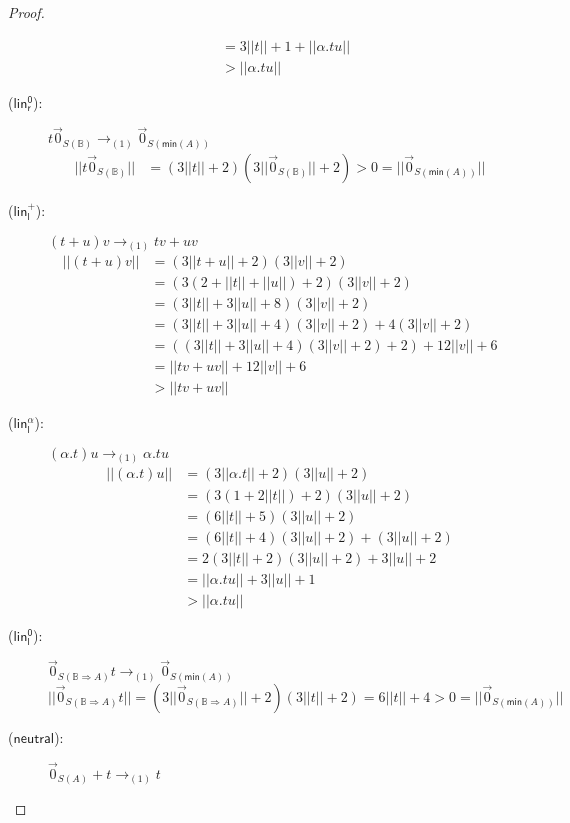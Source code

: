 \documentclass[preprint]{elsarticle}
\newcommand\size[1]{||#1||}
\newcommand\lra[1][1]{\longrightarrow_{\left(#1\right)}}
\newcommand\B{\ensuremath{\mathbb B}}
\newcommand\s[1]{\ensuremath{\mathsf{#1}}}
\newcommand\z[1][A]{\vec 0_{S(#1)}}
\newcommand\nullvec[1]{\z[#1]}
\newcommand\rlinzr{(\s{lin^0_r})}
\newcommand\rlinl{(\s{lin^+_l})}
\newcommand\rlinscall{(\s{lin^\alpha_l})}
\newcommand\rlinzl{(\s{lin^0_l})}
\newcommand\rneut{(\s{neutral})}
\begin{document}
\begin{proof}
\begin{description}
\begin{align*}
     & = 3 \size{t} + 1 + \size{\alpha . {t}{u}} \\
     & > \size{\alpha . {t}{u}}
   \end{align*}
 \item[\rlinzr:] \( {t}{\nullvec{\B}} \lra \nullvec{\mathsf{min}(A)} \)
   \begin{align*}
     \size{{t}{\nullvec{\B}}} & = (3 \size{t} + 2) (3 \size{\nullvec{\B}} +
                                2) > 0 = \size{\nullvec{\mathsf{min}(A)}}
   \end{align*}
 \item[\rlinl:] \( {(t + u)}{v} \lra {t}{v} + {u}{v} \)
   \begin{align*}
     \size{{(t + u)}{v}}
     & = (3 \size{t + u} + 2)(3 \size{v} + 2) \\
     & = (3 (2 + \size{t} + \size{u}) + 2)(3 \size{v} + 2) \\
     & = (3 \size{t} + 3 \size{u} + 8)(3 \size{v} + 2) \\
     & = (3 \size{t} + 3 \size{u} + 4)(3 \size{v} + 2) + 4 (3 \size{v} + 2) \\
     & = ((3 \size{t} + 3 \size{u} + 4)(3 \size{v} + 2) + 2) + 12 \size{v} + 6 \\
     & = \size{{t}{v} + {u}{v}} + 12 \size{v} + 6 \\
     & > \size{{t}{v} + {u}{v}}
   \end{align*}
 \item[\rlinscall:] \( {(\alpha . t)}{u} \lra \alpha . {t}{u} \)
   \begin{align*}
     \size{{(\alpha . t)}{u}}
     & = (3 \size{\alpha . t} + 2)(3 \size{u} + 2) \\
     & = (3 (1 + 2 \size{t}) + 2)(3 \size{u} + 2) \\
     & = (6 \size{t} + 5)(3 \size{u} + 2) \\
     & = (6 \size{t} + 4)(3 \size{u} + 2) + (3 \size{u} + 2) \\
     & = 2 (3 \size{t} + 2)(3 \size{u} + 2) + 3 \size{u} + 2 \\
     & = \size{\alpha . {t}{u}} + 3 \size{u} + 1 \\
     & > \size{\alpha . {t}{u}}
   \end{align*}
 \item[\rlinzl:] \( {\z[\B \Rightarrow A]}{t} \lra \z[\mathsf{min}(A)] \)
   \[
     \size{{\z[\B \Rightarrow A]}{t}} = (3 \size{\z[\B \Rightarrow A]} + 2)(3 \size{t} + 2) = 6 \size{t} + 4 > 0 = \size{\z[\mathsf{min}(A)]}
   \]
 \item[\rneut:] \( \z + t \lra t \)

\end{description}
\end{proof}
\end{document}
